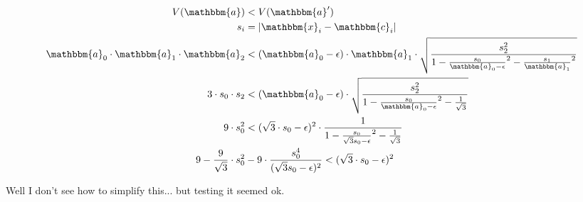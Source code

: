 \documentclass[english,10pt,a4paper,twocolumn,colorscheme=green]{orarticle}
\begin{document}
	\begin{align*}
		V(\mathbbm{a}) &< V(\mathbbm{a}')\\
		s_i &= \lvert \mathbbm{x}_i-\mathbbm{c}_i \rvert\\
		\mathbbm{a}_0 \cdot\mathbbm{a}_1 \cdot\mathbbm{a}_2 &< (\mathbbm{a}_0-\epsilon) \cdot\mathbbm{a}_1 \cdot\sqrt{\frac{s_2^2}{1-\frac{s_0}{\mathbbm{a}_0-\epsilon}^2 - \frac{s_1}{\mathbbm{a}_1}^2}}\\	
		3\cdot s_0\cdot s_2 &< (\mathbbm{a}_0-\epsilon) \cdot\sqrt{\frac{s_2^2}{1-\frac{s_0}{\mathbbm{a}_0-\epsilon}^2 - \frac{1}{\sqrt{3}}}}\\
		9\cdot s_0^2 &< (\sqrt{3}\cdot s_0-\epsilon)^2 \cdot\frac{1}{1-\frac{s_0}{\sqrt{3}s_0-\epsilon}^2 - \frac{1}{\sqrt{3}}}\\
		9-\frac{9}{\sqrt{3}}\cdot s_0^2 &- 9 \cdot \frac{s_0^4}{(\sqrt{3}s_0-\epsilon)^2} < (\sqrt{3}\cdot s_0-\epsilon)^2\\
	\end{align*}
	
	Well I don't see how to simplify this... but testing it seemed ok.
	
\end{document}
